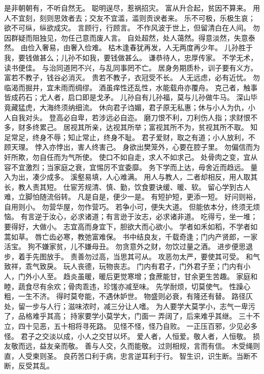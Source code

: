 \documentclass[12pt,UTF8]{ctexbook}
\begin{document}
是非朝朝有，不听自然无。
聪明逞尽，惹祸招灾。
富从升合起，贫因不算来。
用人不宜刻，刻则思效者去；交友不宜滥，滥则贡谀者来。
乐不可极，乐极生哀；欲不可纵，纵欲成灾。
言顾行，行顾言。
不作风波于世上，但留清白在人间。
勿因群疑而阻独见，勿任己意而废人言。
自处超然，处人蔼然。得意淡然，失意泰然。
由俭入奢易，由奢入俭难。
枯木逢春犹再发，人无两度再少年。
儿孙胜于我，要钱做甚么；儿孙不如我，要钱做甚么。
谦恭待人，忠厚传家。
不学无术，读书便佳。
与治同道罔不兴，与乱同事罔不亡。
居身务期质朴，训子要有义方。
富若不教子，钱谷必消灭。
贵若不教子，衣冠受不长。
人无远虑，必有近忧。
勿临渴而掘井，宜未雨而绸缪。
酒虽痒性还乱性，水能载舟亦覆舟。
克己者，触事皆成药石；尤人者，启口即是戈矛。
儿孙自有儿孙福，莫与儿孙做牛马。
深山毕竟藏猛虎，大海终须纳细流。
休向君子诌媚，君子原无私惠；休与小人为仇，小人自我对头。
登高必自卑，若涉远必自迩。
磨刀恨不利，刀利伤人指；求财恨不多，财多终累己。
居视其所亲，达视其所举；富视其所不为，贫视其所不取。
知足常足，终身不辱；知止常止，终身不耻。
君子爱财，取之有道；小人放利，不顾天理。
悖入亦悖出，害人终害己。
身欲出樊笼外，心要在腔子里。
勿偏信而为奸所欺，勿自任而为气所使。
使口不如自走，求人不如求己。
处骨肉之变，宜从容不宜激烈；当家庭之衰，宜惕厉不宜委靡。
务下学而上达，毋舍近而趋远。
量入为出，凑少成多。
溪壑易填，人心难满。
用人与教人，二者却相反，用人取其长，教人责其短。
仕宦芳规清、慎、勤，饮食要诀缓、暖、软。
留心学到古人难，立脚怕随流俗转。
凡是自是，便少一是。
有短护短，更添一短。
好问则裕，自用则小。
勿营华屋，勿作营巧。
若争小可，便失大道。
但能依本分，终须无烦恼。
有言逆于汝心，必求诸道；有言逊于汝志，必求诸非道。
吃得亏，坐一堆；要得好，大做小。
志宜高而身宜下，胆欲大而心欲小。
学者如禾如稻，不学者如蒿如草。
唇亡齿必寒，教弛富难保。
书中结良友，千载奇逢；门内产贤郎，一家活宝。
狗不嫌家贫，儿不嫌母丑。
勿贪意外之财，勿饮过量之酒。
进步便思退步，着手先图放手。
责善勿过高，当思其可从。
攻恶勿太严，要使其可受。
和气致祥，乖气致戾。
玩人丧德，玩物丧志。
门内有君子，门外君子至；门内有小人，门外小人至。
趋炎虽暖，暖后更觉寒增；食蔗能甘，甘余更生苦趣。
家庭和睦，蔬食尽有余欢；骨肉乖违，珍馐亦减至味。
先学耐烦，切莫使气。
性躁心粗，一生不济。
得时莫夸能，不遇休妒世。
物盛则必衰，有隆还有替。
路径仄处，留一步与人行；滋味浓时，减三分让人嗜。
为人要学大莫学小，志气一卑污了，品格难乎其高；
持家要学小莫学大，门面一 弄阔了，后来难乎其继。
三十不立，四十见恶，五十相将寻死路。
见怪不怪，怪乃自败。
一正压百邪，少见必多怪。
君子之交淡以成，小人之交甘以坏。
爱人者，人恒爱。敬人者，人恒敬。
损友敬而远，益友亲而敬。
善与人交，久而能敬。
过则相规，言而有信。
木受绳则直，人受柬则圣。
良药苦口利于病，忠言逆耳利于行。
智生识，识生断。当断不断，反受其乱。
\end{document}
